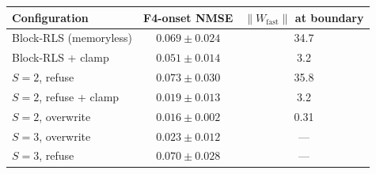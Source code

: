 \begin{tabular}{lcc}
\toprule
Configuration & F4-onset NMSE & $\|W_{\mathrm{fast}}\|$ at boundary \\
\midrule
Block-RLS (memoryless) & $0.069\pm0.024$ & 34.7 \\
Block-RLS + clamp & $0.051\pm0.014$ & 3.2 \\
$S{=}2$, refuse & $0.073\pm0.030$ & 35.8 \\
$S{=}2$, refuse + clamp & $0.019\pm0.013$ & 3.2 \\
$S{=}2$, overwrite & $\mathbf{0.016\pm0.002}$ & 0.31 \\
$S{=}3$, overwrite & $0.023\pm0.012$ & --- \\
$S{=}3$, refuse & $0.070\pm0.028$ & --- \\
\bottomrule
\end{tabular}